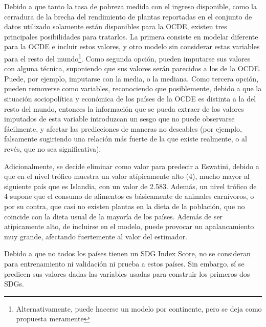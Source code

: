 \documentclass[a4paper,12pt]{amsart}
\begin{document}
    Debido a que tanto la tasa de pobreza medida con el ingreso disponible, como 
    la cerradura de la brecha del rendimiento de plantas reportadas en el 
    conjunto de datos utilizado solamente están disponibles para la OCDE, 
    existen tres principales posibilidades para tratarlos. La primera consiste 
    en modelar diferente para la OCDE e incluir estos valores, y otro modelo sin 
    considerar estas variables para el resto del mundo\footnote{Alternativamente, 
    puede hacerse un modelo por continente, pero se deja como propuesta meramente}.
    Como segunda opción, pueden imputarse sus valores con alguna técnica, suponiendo 
    que sus valores serán parecidos a los de la OCDE. Puede, por ejemplo, imputarse
    con la media, o la mediana. Como tercera opción, pueden removerse como 
    variables, reconociendo que posiblemente, debido a que la situación sociopolítica 
    y económica de los países de la OCDE es distinta a la del resto del mundo, 
    entonces la información que se pueda extraer de los valores imputados de esta 
    variable introduzcan un sesgo que no puede observarse fácilmente, y afectar
    las predicciones de maneras no deseables (por ejemplo, falsamente sugiriendo
    una relación más fuerte de la que existe realmente, o al revés, que no sea 
    significativa).

    Adicionalmente, se decide eliminar como valor para predecir a Eswatini, debido a que 
    en el nivel trófico muestra un valor atípicamente alto (4), mucho mayor al 
    siguiente país que es Islandia, con un valor de 2.583. Además, un nivel 
    trófico de 4 supone que el consumo de alimentos es básicamente de animales 
    carnívoros, o por su contra, que casi no existen plantas en la dieta de la 
    población, que no coincide con la dieta usual de la mayoría de los países. 
    Además de ser atípicamente alto, de incluirse en el modelo, puede provocar 
    un apalancamiento muy grande, afectando fuertemente al valor del estimador. 

    Debido a que no todos los países tienen un SDG Index Score, no se consideran
    para entrenamiento ni validación ni prueba a estos países. Sin embargo, sí 
    se predicen sus valores dadas las variables usadas para construir los primeros 
    dos SDGs.
\end{document}
